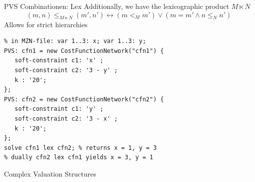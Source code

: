 \begin{frame}[fragile]{PVS Combinationen: Lex}
Additionally, we have the \alert{lexicographic} product $M \ltimes N$ 
\[
(m, n) \leq_{M \ltimes N} (m', n') \leftrightarrow (m <_M m') \vee (m = m' \wedge n \leq_N n')
\]
Allows for strict hierarchies
\begin{lstlisting}
% in MZN-file: var 1..3: x; var 1..3: y;
PVS: cfn1 = new CostFunctionNetwork("cfn1") {
   soft-constraint c1: 'x' ;
   soft-constraint c2: '3 - y' ;
   k : '20';
}; 
PVS: cfn2 = new CostFunctionNetwork("cfn2") {
   soft-constraint c1: 'y' ;
   soft-constraint c2: '3 - x' ;
   k : '20';
};
solve cfn1 lex cfn2; % returns x = 1, y = 3
% dually cfn2 lex cfn1 yields x = 3, y = 1 
\end{lstlisting}
\end{frame}

\begin{frame}{Complex Valuation Structures}
\fontsize{8pt}{7.2}\selectfont


\hfill \small \cite{SchiendorferPvs2015}
%
%
%
\end{frame}